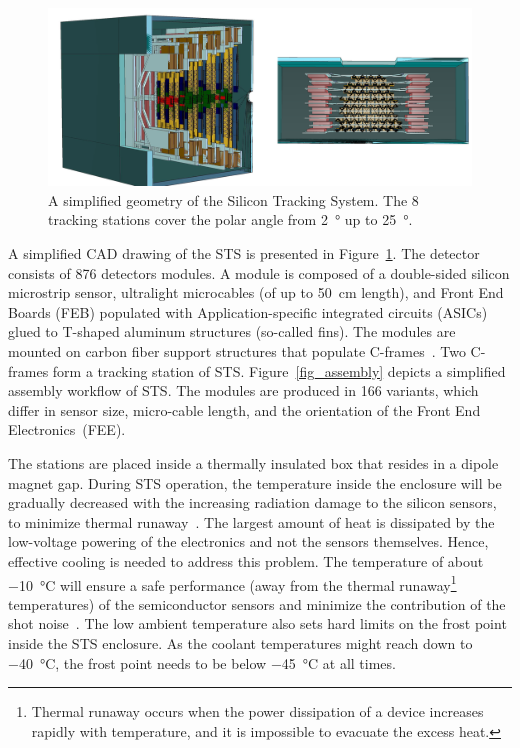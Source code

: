 \begin{figure}[!h]
\centering
\includegraphics[width=0.85\columnwidth]{Chapter2/images/STS.png}
\caption{A simplified geometry of the Silicon Tracking System. The 8 tracking stations cover the polar angle from \SI{2}{\degree} up to \SI{25}{\degree}.}
\label{fig_STS}
\end{figure}
A simplified CAD drawing of the \gls{STS} is presented in Figure~\ref{fig_STS}. The detector consists of 876 detectors modules. A module is composed of a double-sided silicon microstrip sensor, ultralight microcables (of up to \SI{50}{\centi\metre} length), and Front End Boards (\gls{FEB}) populated with Application-specific integrated circuits (\glspl{ASIC}) glued to T-shaped aluminum structures (so-called fins). The modules are mounted on carbon fiber support structures that populate C-frames~\cite{progress_report_2016}. Two C-frames form a tracking station of \gls{STS}.  Figure~\ref{fig_assembly} depicts a simplified assembly workflow of \gls{STS}.
The modules are produced in 166 variants, which differ in sensor size, micro-cable length, and the orientation of the Front End Electronics~(\gls{FEE}).  


The stations are placed inside a thermally insulated box that resides in a dipole magnet gap. During \gls{STS} operation, the temperature inside the enclosure will be gradually decreased with the increasing radiation damage to the silicon sensors, to minimize thermal runaway~\cite{Spieler}. The largest amount of heat is dissipated by the low-voltage powering of the electronics and not the sensors themselves. Hence, effective cooling is needed to address this problem.
The temperature of about \SI{-10}{\celsius} will ensure a safe performance (away from the thermal runaway\footnote{Thermal runaway occurs when the power dissipation of a device increases rapidly with temperature, and it is impossible to evacuate the excess heat.} temperatures) of the semiconductor sensors and minimize the contribution of the shot noise~\cite{Spieler}. The low ambient temperature also sets hard limits on the frost point inside the STS enclosure. As the coolant temperatures might reach down to \SI{-40}{\celsius}, the frost point needs to be below \SI{-45}{\celsius} at all times. 

